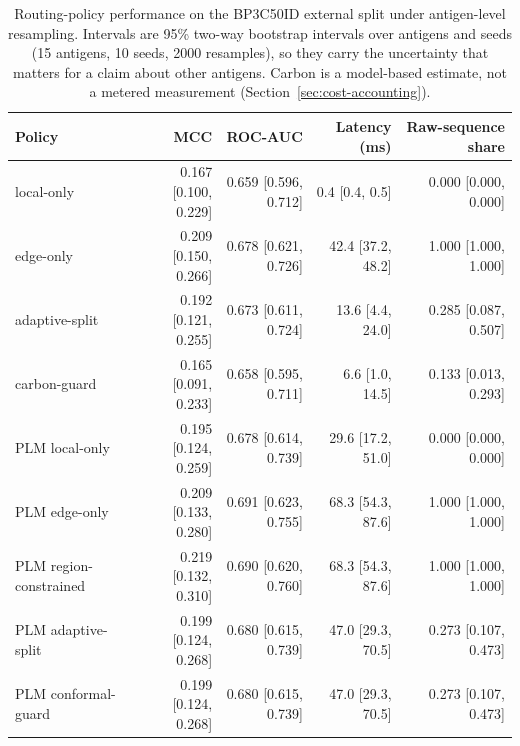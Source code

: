 \begin{table}[t]
\centering
\caption{Routing-policy performance on the BP3C50ID external split under antigen-level resampling. Intervals are 95\% two-way bootstrap intervals over antigens and seeds (15 antigens, 10 seeds, 2000 resamples), so they carry the uncertainty that matters for a claim about other antigens. Carbon is a model-based estimate, not a metered measurement (Section~\ref{sec:cost-accounting}).}
\label{tab:policy-summary}
\small
\begin{tabular}{lrrrr}
\toprule
Policy & MCC & ROC-AUC & Latency (ms) & Raw-sequence share \\
\midrule
local-only & 0.167 \tiny[0.100, 0.229] & 0.659 \tiny[0.596, 0.712] & 0.4 \tiny[0.4, 0.5] & 0.000 \tiny[0.000, 0.000] \\
edge-only & 0.209 \tiny[0.150, 0.266] & 0.678 \tiny[0.621, 0.726] & 42.4 \tiny[37.2, 48.2] & 1.000 \tiny[1.000, 1.000] \\
adaptive-split & 0.192 \tiny[0.121, 0.255] & 0.673 \tiny[0.611, 0.724] & 13.6 \tiny[4.4, 24.0] & 0.285 \tiny[0.087, 0.507] \\
carbon-guard & 0.165 \tiny[0.091, 0.233] & 0.658 \tiny[0.595, 0.711] & 6.6 \tiny[1.0, 14.5] & 0.133 \tiny[0.013, 0.293] \\
\midrule
PLM local-only & 0.195 \tiny[0.124, 0.259] & 0.678 \tiny[0.614, 0.739] & 29.6 \tiny[17.2, 51.0] & 0.000 \tiny[0.000, 0.000] \\
PLM edge-only & 0.209 \tiny[0.133, 0.280] & 0.691 \tiny[0.623, 0.755] & 68.3 \tiny[54.3, 87.6] & 1.000 \tiny[1.000, 1.000] \\
PLM region-constrained & 0.219 \tiny[0.132, 0.310] & 0.690 \tiny[0.620, 0.760] & 68.3 \tiny[54.3, 87.6] & 1.000 \tiny[1.000, 1.000] \\
PLM adaptive-split & 0.199 \tiny[0.124, 0.268] & 0.680 \tiny[0.615, 0.739] & 47.0 \tiny[29.3, 70.5] & 0.273 \tiny[0.107, 0.473] \\
PLM conformal-guard & 0.199 \tiny[0.124, 0.268] & 0.680 \tiny[0.615, 0.739] & 47.0 \tiny[29.3, 70.5] & 0.273 \tiny[0.107, 0.473] \\
\bottomrule
\end{tabular}
\end{table}
